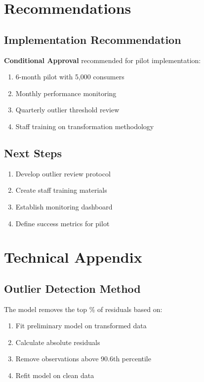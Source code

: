 \section{Recommendations}

\subsection{Implementation Recommendation}

\textbf{Conditional Approval} recommended for pilot implementation:

\begin{enumerate}
    \item 6-month pilot with 5,000 consumers
    \item Monthly performance monitoring
    \item Quarterly outlier threshold review
    \item Staff training on transformation methodology
\end{enumerate}

\subsection{Next Steps}

\begin{enumerate}
    \item Develop outlier review protocol
    \item Create staff training materials
    \item Establish monitoring dashboard
    \item Define success metrics for pilot
\end{enumerate}

\section{Technical Appendix}

\subsection{Outlier Detection Method}

The model removes the top \ModelOneOutlierPercentage{}\% of residuals based on:
\begin{enumerate}
    \item Fit preliminary model on transformed data
    \item Calculate absolute residuals
    \item Remove observations above 90.6th percentile
    \item Refit model on clean data
\end{enumerate}

